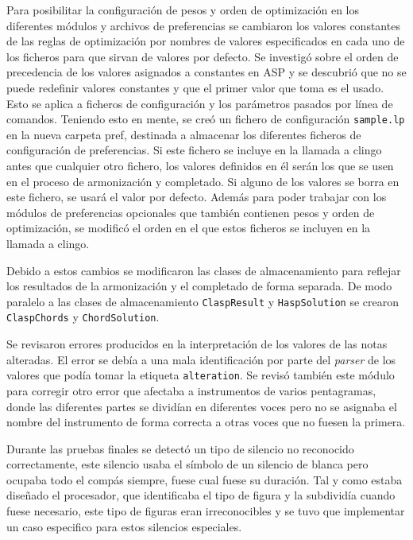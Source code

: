 Para posibilitar la configuración de pesos y orden de optimización en los diferentes módulos y archivos de preferencias se cambiaron los valores constantes de las reglas de optimización por nombres de valores especificados en cada uno de los ficheros para que sirvan de valores por defecto. Se investigó sobre el orden de precedencia de los valores asignados a constantes en ASP y se descubrió que no se puede redefinir valores constantes y que el primer valor que toma es el usado. Esto se aplica a ficheros de configuración y los parámetros pasados por línea de comandos. Teniendo esto en mente, se creó un fichero de configuración \texttt{sample.lp} en la nueva carpeta pref, destinada a almacenar los diferentes ficheros de configuración de preferencias. Si este fichero se incluye en la llamada a clingo antes que cualquier otro fichero, los valores definidos en él serán los que se usen en el proceso de armonización y completado. Si alguno de los valores se borra en este fichero, se usará el valor por defecto. Además para poder trabajar con los módulos de preferencias opcionales que también contienen pesos y orden de optimización, se modificó el orden en el que estos ficheros se incluyen en la llamada a clingo.

Debido a estos cambios se modificaron las clases de almacenamiento para reflejar los resultados de la armonización y el completado de forma separada. De modo paralelo a las clases de almacenamiento \texttt{ClaspResult} y \texttt{HaspSolution} se crearon \texttt{ClaspChords} y \texttt{ChordSolution}.

Se revisaron errores producidos en la interpretación de los valores de las notas alteradas. El error se debía a una mala identificación por parte del \textit{parser} de los valores que podía tomar la etiqueta \texttt{alteration}. Se revisó también este módulo para corregir otro error que afectaba a instrumentos de varios pentagramas, donde las diferentes partes se dividían en diferentes voces pero no se asignaba el nombre del instrumento de forma correcta a otras voces que no fuesen la primera.

Durante las pruebas finales se detectó un tipo de silencio no reconocido correctamente, este silencio usaba el símbolo de un silencio de blanca pero ocupaba todo el compás siempre, fuese cual fuese su duración. Tal y como estaba diseñado el procesador, que identificaba el tipo de figura y la subdividía cuando fuese necesario, este tipo de figuras eran irreconocibles y se tuvo que implementar un caso especifico para estos silencios especiales. 

